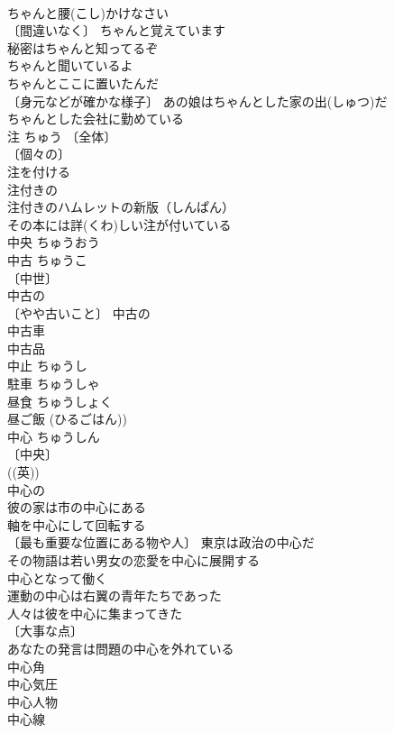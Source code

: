 \documentclass[8pt]{extreport}
\begin{document}
\begin{CJK}{UTF8}{min}
\\	ちゃんと腰(こし)かけなさい 
\\	〔間違いなく〕 ちゃんと覚えています 
\\	秘密はちゃんと知ってるぞ 
\\	ちゃんと聞いているよ 
\\	ちゃんとここに置いたんだ 
\\	〔身元などが確かな様子〕 あの娘はちゃんとした家の出(しゅつ)だ 
\\	ちゃんとした会社に勤めている 
\\	注	ちゅう	〔全体〕
\\	〔個々の〕
\\	注を付ける 
\\	注付きの 
\\	注付きのハムレットの新版（しんぱん） 
\\	その本には詳(くわ)しい注が付いている 
\\	中央	ちゅうおう	
\\	中古	ちゅうこ	
\\	〔中世〕
\\	中古の 
\\	〔やや古いこと〕 中古の 
\\	中古車 
\\	中古品 
\\	中止	ちゅうし	
\\	駐車	ちゅうしゃ	
\\	昼食	ちゅうしょく	
\\	昼ご飯 (ひるごはん))
\\	中心	ちゅうしん	
\\	〔中央〕
\\	((英)) 
\\	中心の 
\\	彼の家は市の中心にある 
\\	軸を中心にして回転する 
\\	〔最も重要な位置にある物や人〕 東京は政治の中心だ 
\\	その物語は若い男女の恋愛を中心に展開する 
\\	中心となって働く 
\\	運動の中心は右翼の青年たちであった 
\\	人々は彼を中心に集まってきた 
\\	〔大事な点〕
\\	あなたの発言は問題の中心を外れている 
\\	中心角 
\\	中心気圧 
\\	中心人物 
\\	中心線 

\end{CJK}
\end{document}
